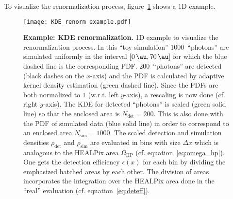 To visualize the renormalization process, figure~\ref{deteff:1d_example} shows a 1D example.

\begin{figure}[H]
	\centering
	\texttt{[image: KDE\_renorm\_example.pdf]}
	\caption[Example: KDE renormalization]{\textbf{Example: KDE renormalization.} 1D example to visualize the renormalization process. In this \enquote{toy simulation} \num{1000}~\enquote{photons} are simulated uniformly in the interval $[\SI{0}{\au},\SI{70}{\au}]$ for which the blue dashed line is the corresponding PDF. \num{200}~\enquote{photons} are detected (black dashes on the $x$-axis) and the PDF is calculated by adaptive kernel density estimation (green dashed line). Since the PDFs are both normalized to $1$ (w.r.t. left $y$-axis), a rescaling is now done (cf. right $y$-axis). The KDE for detected \enquote{photons} is scaled (green solid line) so that the enclosed area is $N_\text{det}=\num{200}$. This is also done with the PDF of simulated data (blue solid line) in order to correspond to an enclosed area $N_\text{sim}=\num{1000}$. The scaled detection and simulation densities $\rho_\text{det}$ and $\rho_\text{sim}$ are evaluated in bins with size $\Delta x$ which is analogous to the HEALPix area $\Omega_\text{HP}$ (cf. equation~\eqref{eq:omega_hp}). One gets the detection efficiency $\epsilon(x)$ for each bin by dividing the emphasized hatched areas by each other. The division of areas incorporates the integration over the HEALPix area done in the \enquote{real} evaluation (cf. equation~\eqref{eq:deteff}).}
	\label{deteff:1d_example}	
\end{figure}